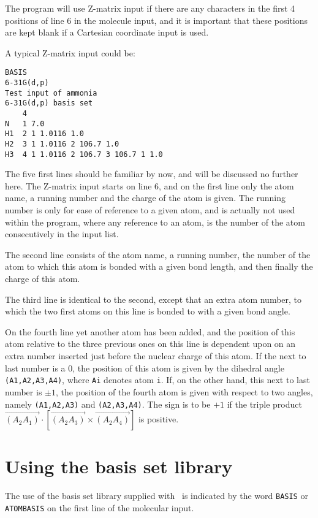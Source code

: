 The program will use Z-matrix input if there are
any characters
in the first 4 positions of line 6 in the molecule input, and it is
important that these positions are kept blank if a Cartesian coordinate
input is  used.

A typical Z-matrix input could be:
\begin{verbatim}
BASIS
6-31G(d,p)
Test input of ammonia
6-31G(d,p) basis set
    4
N   1 7.0
H1  2 1 1.0116 1.0
H2  3 1 1.0116 2 106.7 1.0
H3  4 1 1.0116 2 106.7 3 106.7 1 1.0
\end{verbatim}
The five first lines should be familiar by now, and will be discussed
no further here. The Z-matrix input starts on line 6, and on the first
line only the atom name, a running number and the charge of the
atom
is given. The running number is only for
ease of reference to a given atom, and is actually not used within the
program, where any reference to an atom, is  the number of the
atom consecutively in the input list.

The second line consists of the atom name, a running number, the
number of the atom to which this atom is bonded with a given bond
length, and then finally the charge of this atom.

The third line is identical to the second, except that an extra atom
number, to which the two first atoms on this line is bonded to with a
given bond angle.

On the fourth line yet another atom has been added, and the position
of this atom relative to the three previous ones on this line is
dependent upon on an extra number inserted just before the nuclear
charge of this atom. If the next to last number is a 0, the
position of this atom is given by the dihedral angle {\tt
(A1,A2,A3,A4)}, where {\tt Ai} denotes atom {\tt i}. If, on the other
hand, this next to last number is $\pm 1$, the position of the fourth
atom is given with respect to two angles, namely {\tt (A1,A2,A3)} and
{\tt (A2,A3,A4)}. The sign is to be $+ 1$ if the triple product
$\overrightarrow{\left(A_{2}A_{1}\right)}\cdot\left[\overrightarrow{\left(A_{2}A_{3}\right)}\times\overrightarrow{\left(A_{2}A_{4}\right)}\right]$
is positive.

\section{Using the basis set library}\label{sec:molbasis}

The use of the basis set library supplied with \siraba\ is indicated
by the word {\tt BASIS} or {\tt ATOMBASIS} on the first line of the
molecular input.

